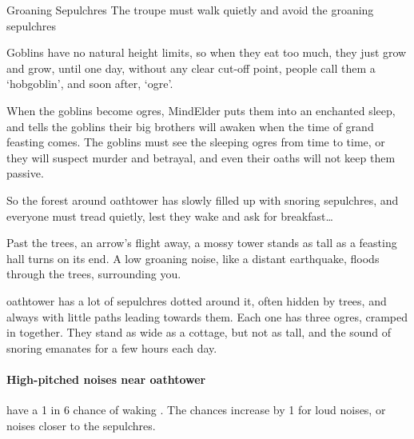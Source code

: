 \begin{multicols}{2}

{Groaning Sepulchres}%
{The troupe must walk quietly and avoid the groaning sepulchres}%


\begin{exampletext}
  Goblins have no natural height limits, so when they eat too much, they just grow and grow, until one day, without any clear cut-off point, people call them a `hobgoblin', and soon after, `\gls{ogre}'.

  When the goblins become \glspl{ogre}, \gls{MindElder} puts them into an enchanted sleep, and tells the goblins their big brothers will awaken when the time of grand feasting comes.
  The goblins must see the sleeping \glspl{ogre} from time to time, or they will suspect murder and betrayal, and even their oaths will not keep them passive.

  So the forest around \gls{oathtower} has slowly filled up with snoring sepulchres, and everyone must tread quietly, lest they wake and ask for breakfast\ldots
\end{exampletext}

\begin{boxtext}
  Past the trees, an arrow's flight away, a mossy tower stands as tall as a feasting hall turns on its end.
  A low groaning noise, like a distant earthquake, floods through the trees, surrounding you.
\end{boxtext}

\Gls{oathtower} has a lot of sepulchres dotted around it, often hidden by trees, and always with little paths leading towards them.
Each one has three \glspl{ogre}, cramped in together.
They stand as wide as a cottage, but not as tall, and the sound of snoring emanates for a few hours each day.

\paragraph{High-pitched noises near \gls{oathtower}}
have a 1 in 6 chance of waking .
The chances increase by 1 for loud noises, or noises closer to the sepulchres.


\end{multicols}
